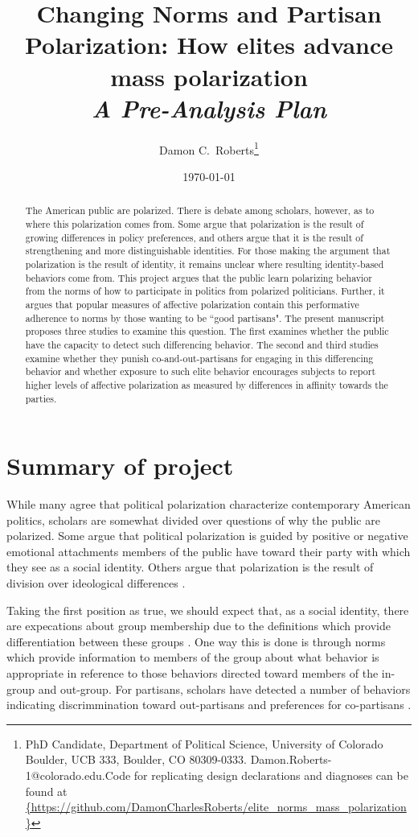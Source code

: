 \documentclass[12pt]{article}
\title{Changing Norms and Partisan Polarization: How elites advance mass polarization \\\large \textit{A Pre-Analysis Plan}}
\author{Damon C.\ Roberts\footnote{PhD Candidate,
Department of Political Science, University of Colorado Boulder, UCB 333, Boulder, CO 80309-0333. Damon.Roberts-1@colorado.edu.\newline Code for replicating design declarations and diagnoses can be found at \url{{https://github.com/DamonCharlesRoberts/elite_norms_mass_polarization}}}}
\date{\today}
\begin{document}
\maketitle
\begin{abstract}
The American public are polarized. There is debate among scholars, however, as to where this polarization comes from. Some argue that polarization is the result of growing differences in policy preferences, and others argue that it is the result of strengthening and more distinguishable identities. For those making the argument that polarization is the result of identity, it remains unclear where resulting identity-based behaviors come from. This project argues that the public learn polarizing behavior from the norms of how to participate in politics from polarized politicians. Further, it argues that popular measures of affective polarization contain this performative adherence to norms by those wanting to be ``good partisans". The present manuscript proposes three studies to examine this question. The first examines whether the public have the capacity to detect such differencing behavior. The second and third studies examine whether they punish co-and-out-partisans for engaging in this differencing behavior and whether exposure to such elite behavior encourages subjects to report higher levels of affective polarization as measured by differences in affinity towards the parties. 
\end{abstract}

\newpage 
\section{Summary of project}
While many agree that political polarization characterize contemporary American politics, scholars are somewhat divided over questions of why the public are polarized. Some argue that political polarization is guided by positive or negative emotional attachments members of the public have toward their party \citep[see][]{iyengar_et-al_2012} with which they see as a social identity. Others argue that polarization is the result of division over ideological differences \citep[see][]{fiorina_abrams_2008}.

Taking the first position as true, we should expect that, as a social identity, there are expecations about group membership due to the definitions which provide differentiation between these groups \citep{huddy_2001}. One way this is done is through norms which provide information to members of the group about what behavior is appropriate in reference to those behaviors directed toward members of the in-group and out-group. For partisans, scholars have detected a number of behaviors indicating discrimmination toward out-partisans and preferences for co-partisans \citep[see][]{iyengar_westwood_2015}.
\end{document}
